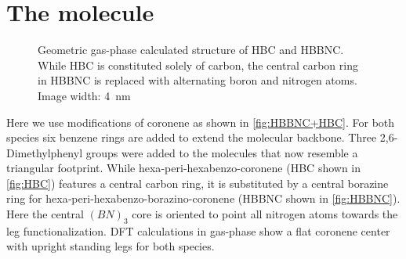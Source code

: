 \section{The molecule}
\begin{figure}[ht]\centering
	 \quad
	\caption{Geometric gas-phase calculated structure of  HBC and  HBBNC. While HBC is constituted solely of carbon, the central carbon ring in HBBNC is replaced with alternating boron and nitrogen atoms. Image width: \SI{4}{\nano \meter}}
	\label{fig:HBBNC+HBC}
\end{figure}


Here we use modifications of coronene as shown in \autoref{fig:HBBNC+HBC}. For both species six benzene rings are added to extend the molecular backbone. Three 2,6-Dimethylphenyl groups were added to the molecules that now resemble a triangular footprint. While hexa‐peri‐hexabenzo-coronene (HBC shown in \autoref{fig:HBC}) features a central carbon ring, it is substituted by a central borazine ring for hexa‐peri‐hexabenzo-borazino-coronene (HBBNC shown in \autoref{fig:HBBNC}). Here the central $(BN)_3$ core is oriented to point all nitrogen atoms towards the leg functionalization. DFT calculations in gas-phase show a flat coronene center with upright standing legs for both species.

